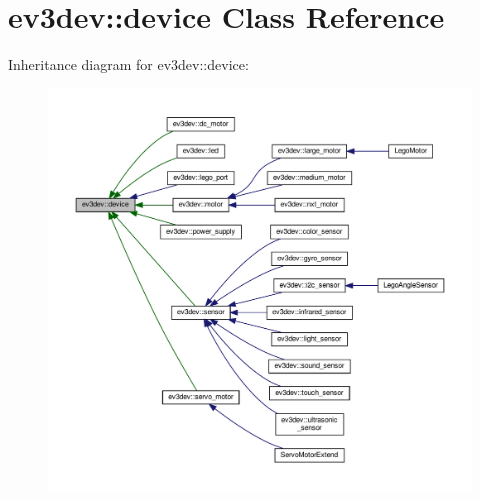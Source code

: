 \hypertarget{classev3dev_1_1device}{}\section{ev3dev\+:\+:device Class Reference}
\label{classev3dev_1_1device}


Inheritance diagram for ev3dev\+:\+:device\+:
\nopagebreak
\begin{figure}[H]
\begin{center}
\leavevmode
\includegraphics[width=350pt]{classev3dev_1_1device__inherit__graph}
\end{center}
\end{figure}

